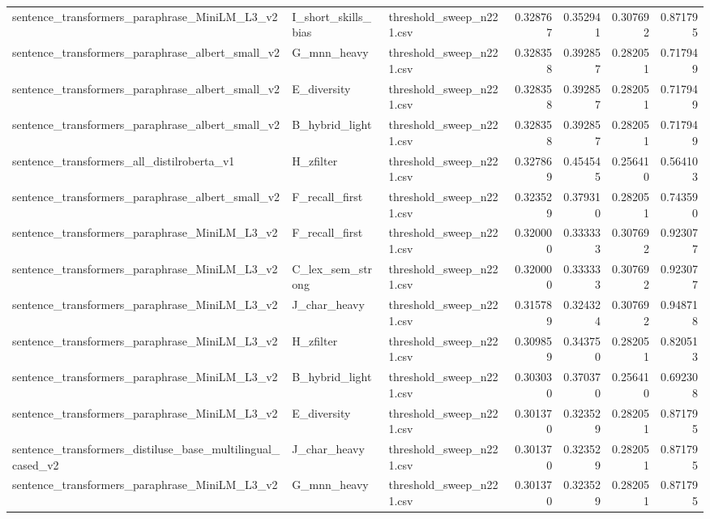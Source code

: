 \begin{table}[!ht]
\begin{tabular}{lllrrrr}
sentence\_transformers\_paraphrase\_MiniLM\_L3\_v2 & I\_short\_skills\_bias & threshold\_sweep\_n221.csv & 0.328767 & 0.352941 & 0.307692 & 0.871795 \\
sentence\_transformers\_paraphrase\_albert\_small\_v2 & G\_mnn\_heavy & threshold\_sweep\_n221.csv & 0.328358 & 0.392857 & 0.282051 & 0.717949 \\
sentence\_transformers\_paraphrase\_albert\_small\_v2 & E\_diversity & threshold\_sweep\_n221.csv & 0.328358 & 0.392857 & 0.282051 & 0.717949 \\
sentence\_transformers\_paraphrase\_albert\_small\_v2 & B\_hybrid\_light & threshold\_sweep\_n221.csv & 0.328358 & 0.392857 & 0.282051 & 0.717949 \\
sentence\_transformers\_all\_distilroberta\_v1 & H\_zfilter & threshold\_sweep\_n221.csv & 0.327869 & 0.454545 & 0.256410 & 0.564103 \\
sentence\_transformers\_paraphrase\_albert\_small\_v2 & F\_recall\_first & threshold\_sweep\_n221.csv & 0.323529 & 0.379310 & 0.282051 & 0.743590 \\
sentence\_transformers\_paraphrase\_MiniLM\_L3\_v2 & F\_recall\_first & threshold\_sweep\_n221.csv & 0.320000 & 0.333333 & 0.307692 & 0.923077 \\
sentence\_transformers\_paraphrase\_MiniLM\_L3\_v2 & C\_lex\_sem\_strong & threshold\_sweep\_n221.csv & 0.320000 & 0.333333 & 0.307692 & 0.923077 \\
sentence\_transformers\_paraphrase\_MiniLM\_L3\_v2 & J\_char\_heavy & threshold\_sweep\_n221.csv & 0.315789 & 0.324324 & 0.307692 & 0.948718 \\
sentence\_transformers\_paraphrase\_MiniLM\_L3\_v2 & H\_zfilter & threshold\_sweep\_n221.csv & 0.309859 & 0.343750 & 0.282051 & 0.820513 \\
sentence\_transformers\_paraphrase\_MiniLM\_L3\_v2 & B\_hybrid\_light & threshold\_sweep\_n221.csv & 0.303030 & 0.370370 & 0.256410 & 0.692308 \\
sentence\_transformers\_paraphrase\_MiniLM\_L3\_v2 & E\_diversity & threshold\_sweep\_n221.csv & 0.301370 & 0.323529 & 0.282051 & 0.871795 \\
sentence\_transformers\_distiluse\_base\_multilingual\_cased\_v2 & J\_char\_heavy & threshold\_sweep\_n221.csv & 0.301370 & 0.323529 & 0.282051 & 0.871795 \\
sentence\_transformers\_paraphrase\_MiniLM\_L3\_v2 & G\_mnn\_heavy & threshold\_sweep\_n221.csv & 0.301370 & 0.323529 & 0.282051 & 0.871795 \\

\end{tabular}
\end{table}
